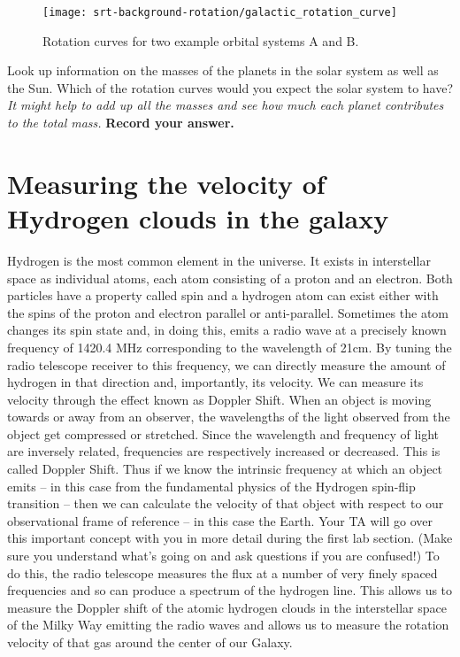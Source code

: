 \begin{figure}
	\centering
	\texttt{[image: srt-background-rotation/galactic\_rotation\_curve]}
	\caption{Rotation curves for two example orbital systems A and B.}\label{sbr:fig:rotations-a-b}
\end{figure}

\begin{steps}
	\item Look up information on the masses of the planets in the solar system as well as the Sun. Which of the rotation curves would you expect the solar system to have? \textit{It might help to add up all the masses and see how much each planet contributes to the total mass.} \textbf{Record your answer.}
\end{steps}

\section{Measuring the velocity of Hydrogen clouds in the galaxy}
Hydrogen is the most common element in the universe. It exists in
interstellar space as individual atoms, each atom consisting of a proton and an
electron. Both particles have a property called spin and a hydrogen atom can
exist either with the spins of the proton and electron parallel or anti-parallel.
Sometimes the atom changes its spin state and, in doing this, emits a radio wave
at a precisely known frequency of 1420.4 MHz corresponding to the wavelength
of 21cm. By tuning the radio telescope receiver to this frequency, we can directly measure
the amount of hydrogen in that direction and, importantly, its velocity.
We can measure its velocity through the effect known as Doppler Shift.
When an object is moving towards or away from an observer, the wavelengths of
the light observed from the object get compressed or stretched. Since the
wavelength and frequency of light are inversely related, frequencies are
respectively increased or decreased. This is called Doppler Shift. Thus if we
know the intrinsic frequency at which an object emits – in this case from the
fundamental physics of the Hydrogen spin-flip transition – then we can calculate
the velocity of that object with respect to our observational frame of reference –
in this case the Earth. Your TA will go over this important concept with you in
more detail during the first lab section. (Make sure you understand what’s going
on and ask questions if you are confused!)
To do this, the radio telescope measures the flux at a number of very finely
spaced frequencies
 and so can produce a spectrum of the hydrogen line. This allows us to measure the Doppler
shift of the atomic hydrogen clouds in the interstellar space of the Milky Way
emitting the radio waves and allows us to measure the rotation velocity of that
gas around the center of our Galaxy.

